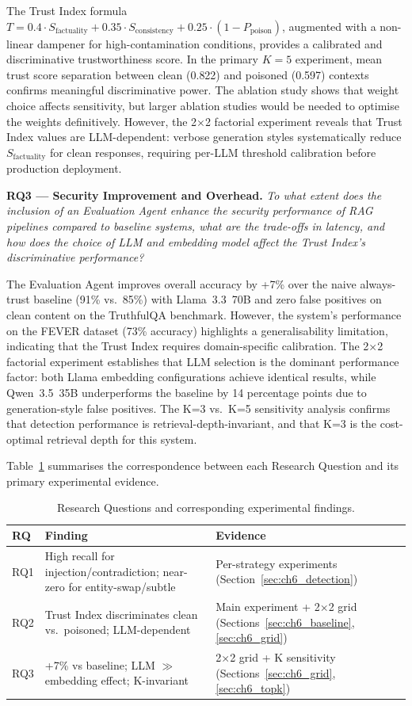 The Trust Index formula $T = 0.4 \cdot S_{\text{factuality}} + 0.35 \cdot S_{\text{consistency}} + 0.25 \cdot (1 - P_{\text{poison}})$, augmented with a non-linear dampener for high-contamination conditions, provides a calibrated and discriminative trustworthiness score. In the primary $K=5$ experiment, mean trust score separation between clean (0.822) and poisoned (0.597) contexts confirms meaningful discriminative power. The ablation study shows that weight choice affects sensitivity, but larger ablation studies would be needed to optimise the weights definitively. However, the 2×2 factorial experiment reveals that Trust Index values are LLM-dependent: verbose generation styles systematically reduce $S_{\text{factuality}}$ for clean responses, requiring per-LLM threshold calibration before production deployment.

\textbf{RQ3 — Security Improvement and Overhead.}
\textit{To what extent does the inclusion of an Evaluation Agent enhance the security performance of RAG pipelines compared to baseline systems, what are the trade-offs in latency, and how does the choice of LLM and embedding model affect the Trust Index's discriminative performance?}

The Evaluation Agent improves overall accuracy by +7\% over the naive always-trust baseline (91\% vs.\ 85\%) with Llama~3.3~70B and zero false positives on clean content on the TruthfulQA benchmark. However, the system's performance on the FEVER dataset (73\% accuracy) highlights a generalisability limitation, indicating that the Trust Index requires domain-specific calibration. The 2×2 factorial experiment establishes that LLM selection is the dominant performance factor: both Llama embedding configurations achieve identical results, while Qwen~3.5~35B underperforms the baseline by 14 percentage points due to generation-style false positives. The K=3 vs.\ K=5 sensitivity analysis confirms that detection performance is retrieval-depth-invariant, and that K=3 is the cost-optimal retrieval depth for this system.

Table~\ref{tab:conc_rq_summary} summarises the correspondence between each Research Question and its primary experimental evidence.

\begin{table}[h]
\centering
\caption{Research Questions and corresponding experimental findings.}
\label{tab:conc_rq_summary}
\begin{tabular}{lp{5cm}p{6cm}}
\hline
\textbf{RQ} & \textbf{Finding} & \textbf{Evidence} \\
\hline
RQ1 & High recall for injection/contradiction; near-zero for entity-swap/subtle & Per-strategy experiments (Section~\ref{sec:ch6_detection}) \\
RQ2 & Trust Index discriminates clean vs.\ poisoned; LLM-dependent & Main experiment + 2×2 grid (Sections~\ref{sec:ch6_baseline}, \ref{sec:ch6_grid}) \\
RQ3 & +7\% vs baseline; LLM $\gg$ embedding effect; K-invariant & 2×2 grid + K sensitivity (Sections~\ref{sec:ch6_grid}, \ref{sec:ch6_topk}) \\
\hline
\end{tabular}
\end{table}

